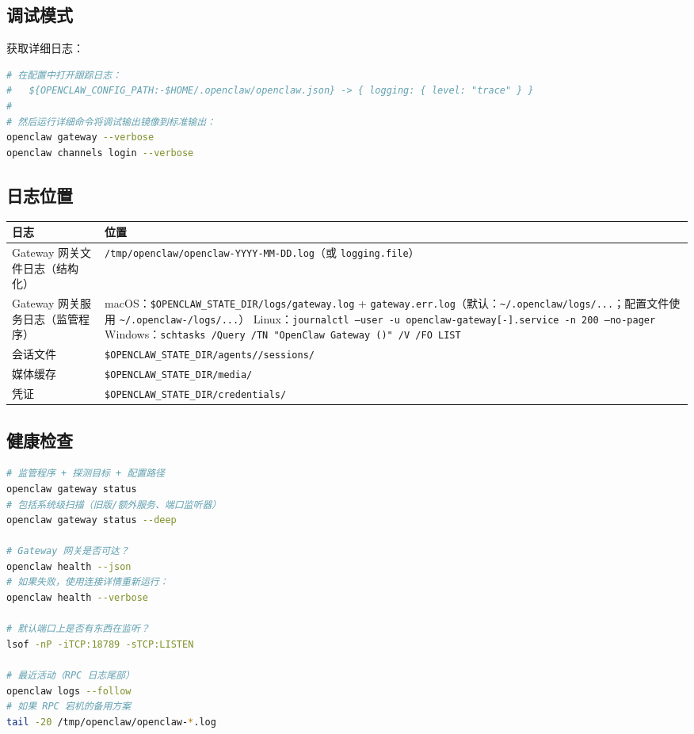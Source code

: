 \subsection{调试模式}


获取详细日志：

\begin{lstlisting}[language=bash]
# 在配置中打开跟踪日志：
#   ${OPENCLAW_CONFIG_PATH:-$HOME/.openclaw/openclaw.json} -> { logging: { level: "trace" } }
#
# 然后运行详细命令将调试输出镜像到标准输出：
openclaw gateway --verbose
openclaw channels login --verbose
\end{lstlisting}


\subsection{日志位置}



\begin{table}[h]
\centering
\small
\begin{tabular}{|l|l|}
\hline
日志 & 位置 \\
\hline
Gateway 网关文件日志（结构化） & \texttt{/tmp/openclaw/openclaw-YYYY-MM-DD.log}（或 \texttt{logging.file}） \\
\hline
Gateway 网关服务日志（监管程序） & macOS：\texttt{\$OPENCLAW\_STATE\_DIR/logs/gateway.log} + \texttt{gateway.err.log}（默认：\texttt{\textasciitilde{}/.openclaw/logs/...}；配置文件使用 \texttt{\textasciitilde{}/.openclaw-/logs/...}） Linux：\texttt{journalctl --user -u openclaw-gateway[-].service -n 200 --no-pager} Windows：\texttt{schtasks /Query /TN "OpenClaw Gateway ()" /V /FO LIST} \\
\hline
会话文件 & \texttt{\$OPENCLAW\_STATE\_DIR/agents//sessions/} \\
\hline
媒体缓存 & \texttt{\$OPENCLAW\_STATE\_DIR/media/} \\
\hline
凭证 & \texttt{\$OPENCLAW\_STATE\_DIR/credentials/} \\
\hline
\end{tabular}
\end{table}



\subsection{健康检查}


\begin{lstlisting}[language=bash]
# 监管程序 + 探测目标 + 配置路径
openclaw gateway status
# 包括系统级扫描（旧版/额外服务、端口监听器）
openclaw gateway status --deep

# Gateway 网关是否可达？
openclaw health --json
# 如果失败，使用连接详情重新运行：
openclaw health --verbose

# 默认端口上是否有东西在监听？
lsof -nP -iTCP:18789 -sTCP:LISTEN

# 最近活动（RPC 日志尾部）
openclaw logs --follow
# 如果 RPC 宕机的备用方案
tail -20 /tmp/openclaw/openclaw-*.log
\end{lstlisting}


